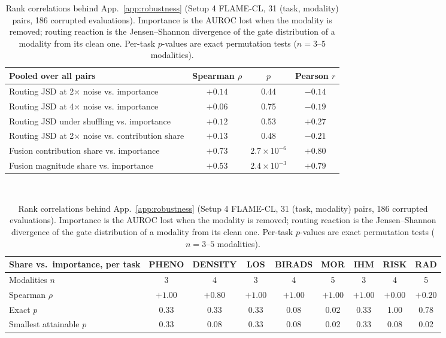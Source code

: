 \begin{table}[t]
\centering
\footnotesize
\setlength{\tabcolsep}{4pt}
\caption{Rank correlations behind App.~\ref{app:robustness} (Setup 4 \textsc{FLAME-CL}, 31 (task, modality) pairs, 186 corrupted evaluations). Importance is the AUROC lost when the modality is removed; routing reaction is the Jensen--Shannon divergence of the gate distribution of a modality from its clean one. Per-task $p$-values are exact permutation tests ($n=3$--$5$ modalities).}
\label{tab:robustness-spearman}
\begin{tabular}{lccc}
\toprule
Pooled over all pairs & Spearman $\rho$ & $p$ & Pearson $r$ \\
\midrule
Routing JSD at 2$\times$ noise vs. importance & $+0.14$ & 0.44 & $-0.14$ \\
Routing JSD at 4$\times$ noise vs. importance & $+0.06$ & 0.75 & $-0.19$ \\
Routing JSD under shuffling vs. importance & $+0.12$ & 0.53 & $+0.27$ \\
Routing JSD at 2$\times$ noise vs. contribution share & $+0.13$ & 0.48 & $-0.21$ \\
Fusion contribution share vs. importance & $+0.73$ & $2.7\times10^{-6}$ & $+0.80$ \\
Fusion magnitude share vs. importance & $+0.53$ & $2.4\times10^{-3}$ & $+0.79$ \\
\bottomrule
\end{tabular}
\\[6pt]
\begin{tabular}{lcccccccc}
\toprule
Share vs.\ importance, per task & PHENO & DENSITY & LOS & BIRADS & MOR & IHM & RISK & RAD \\
\midrule
Modalities $n$ & 3 & 4 & 3 & 4 & 5 & 3 & 4 & 5 \\
Spearman $\rho$ & $+1.00$ & $+0.80$ & $+1.00$ & $+1.00$ & $+1.00$ & $+1.00$ & $+0.00$ & $+0.20$ \\
Exact $p$ & 0.33 & 0.33 & 0.33 & 0.08 & 0.02 & 0.33 & 1.00 & 0.78 \\
Smallest attainable $p$ & 0.33 & 0.08 & 0.33 & 0.08 & 0.02 & 0.33 & 0.08 & 0.02 \\
\bottomrule
\end{tabular}
\end{table}
